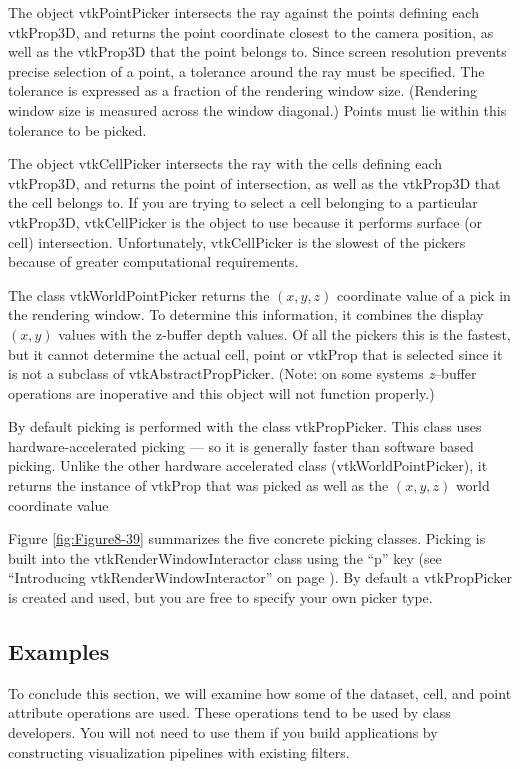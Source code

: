 The object vtkPointPicker intersects the ray against the points defining each vtkProp3D, and returns the point coordinate closest to the camera position, as well as the vtkProp3D that the point belongs to. Since screen resolution prevents precise selection of a point, a tolerance around the ray must be specified. The tolerance is expressed as a fraction of the rendering window size. (Rendering window size is measured across the window diagonal.) Points must lie within this tolerance to be picked.

The object vtkCellPicker intersects the ray with the cells defining each vtkProp3D, and returns the point of intersection, as well as the vtkProp3D that the cell belongs to. If you are trying to select a cell belonging to a particular vtkProp3D, vtkCellPicker is the object to use because it performs surface (or cell) intersection. Unfortunately, vtkCellPicker is the slowest of the pickers because of greater computational requirements.

The class vtkWorldPointPicker returns the $(x,y,z)$ coordinate value of a pick in the rendering window. To determine this information, it combines the display $(x,y)$ values with the z-buffer depth values. Of all the pickers this is the fastest, but it cannot determine the actual cell, point or vtkProp that is selected since it is not a subclass of vtkAbstractPropPicker. (Note: on some systems \emph{z}--buffer operations are inoperative and this object will not function properly.)

By default picking is performed with the class vtkPropPicker. This class uses hardware-accelerated picking --- so it is generally faster than software based picking. Unlike the other hardware accelerated class (vtkWorldPointPicker), it returns the instance of vtkProp that was picked as well as the $(x,y,z)$ world coordinate value

Figure \ref{fig:Figure8-39} summarizes the five concrete picking classes. Picking is built into the vtkRenderWindowInteractor class using the ``p'' key (see ``Introducing vtkRenderWindowInteractor'' on page \pageref{subsec:examples_introducing_vtkRenderWindowInteractor}). By default a vtkPropPicker is created and used, but you are free to specify your own picker type.

\subsection{Examples}

To conclude this section, we will examine how some of the dataset, cell, and point attribute operations are used. These operations tend to be used by class developers. You will not need to use them if you build applications by constructing visualization pipelines with existing filters.

